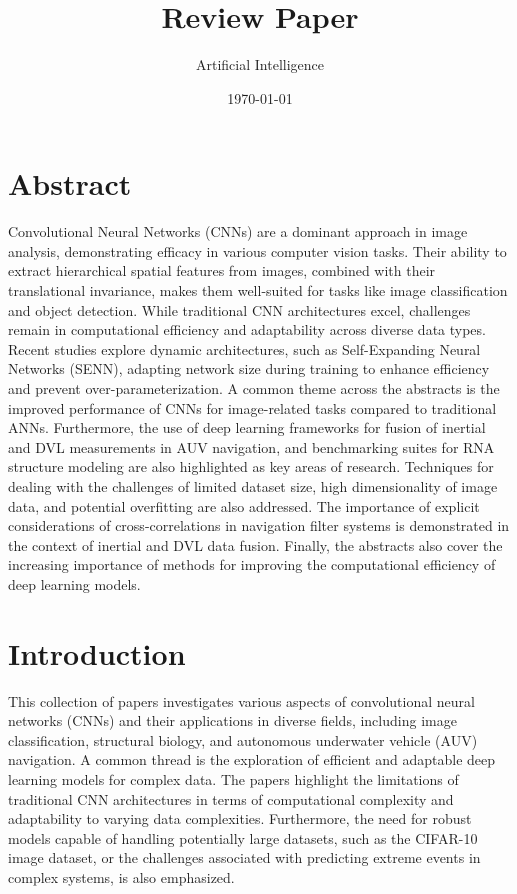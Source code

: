 \documentclass{article}
\begin{document}
\title{Review Paper}
\author{Artificial Intelligence}
\date{\today}
\maketitle
\noindent
\twocolumn

\section*{Abstract}
Convolutional Neural Networks (CNNs) are a dominant approach in image analysis, demonstrating efficacy in various computer vision tasks.  Their ability to extract hierarchical spatial features from images, combined with their translational invariance, makes them well-suited for tasks like image classification and object detection.  While traditional CNN architectures excel, challenges remain in computational efficiency and adaptability across diverse data types.  Recent studies explore dynamic architectures, such as Self-Expanding Neural Networks (SENN), adapting network size during training to enhance efficiency and prevent over-parameterization.  A common theme across the abstracts is the improved performance of CNNs for image-related tasks compared to traditional ANNs.  Furthermore, the use of deep learning frameworks for fusion of inertial and DVL measurements in AUV navigation, and benchmarking suites for RNA structure modeling are also highlighted as key areas of research.  Techniques for dealing with the challenges of limited dataset size, high dimensionality of image data, and potential overfitting are also addressed.  The importance of explicit considerations of cross-correlations in navigation filter systems is demonstrated in the context of inertial and DVL data fusion.  Finally, the abstracts also cover the increasing importance of methods for improving the computational efficiency of deep learning models.


\section*{Introduction}
This collection of papers investigates various aspects of convolutional neural networks (CNNs) and their applications in diverse fields, including image classification, structural biology, and autonomous underwater vehicle (AUV) navigation.  A common thread is the exploration of efficient and adaptable deep learning models for complex data.  The papers highlight the limitations of traditional CNN architectures in terms of computational complexity and adaptability to varying data complexities.  Furthermore, the need for robust models capable of handling potentially large datasets, such as the CIFAR-10 image dataset, or the challenges associated with predicting extreme events in complex systems, is also emphasized.
\end{document}
